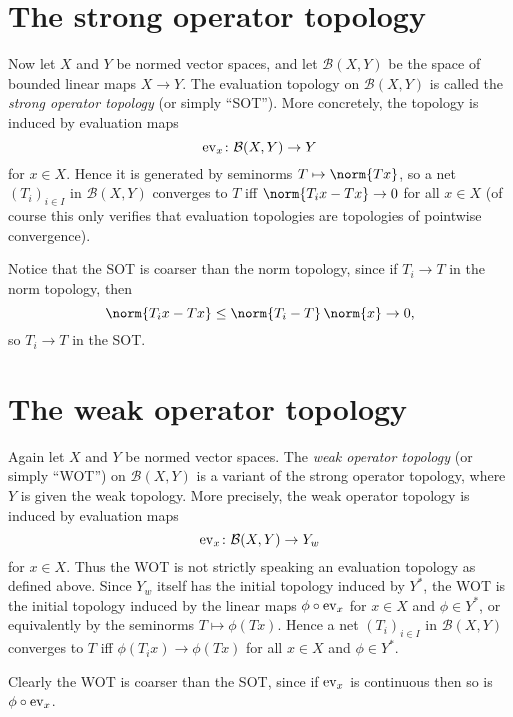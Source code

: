 \documentclass[article, a4paper, 11pt, oneside]{memoir}
\numberwithin{equation}{chapter}
\newcommand{\calB}{\mathcal{B}}
\begin{document}
\section{The strong operator topology}

Now let $X$ and $Y$ be normed vector spaces, and let $\calB(X,Y)$ be the space of bounded linear maps $X \to Y$. The evaluation topology on $\calB(X,Y)$ is called the \emph{strong operator topology} (or simply \enquote{SOT}). More concretely, the topology is induced by evaluation maps
%
\begin{equation*}
    \ev_x \colon \calB(X,Y) \to Y
\end{equation*}
%
for $x \in X$. Hence it is generated by seminorms $T \mapsto \norm{Tx}$, so a net $(T_i)_{i \in I}$ in $\calB(X,Y)$ converges to $T$ iff $\norm{T_i x - Tx} \to 0$ for all $x \in X$ (of course this only verifies that evaluation topologies are topologies of pointwise convergence).
    
Notice that the SOT is coarser than the norm topology, since if $T_i \to T$ in the norm topology, then
%
\begin{equation*}
    \norm{T_i x - Tx}
        \leq \norm{T_i - T} \, \norm{x}
        \to 0,
\end{equation*}
%
so $T_i \to T$ in the SOT.


\section{The weak operator topology}

Again let $X$ and $Y$ be normed vector spaces. The \emph{weak operator topology} (or simply \enquote{WOT}) on $\calB(X,Y)$ is a variant of the strong operator topology, where $Y$ is given the weak topology. More precisely, the weak operator topology is induced by evaluation maps
%
\begin{equation*}
    \ev_x \colon \calB(X,Y) \to Y_w
\end{equation*}
%
for $x \in X$. Thus the WOT is not strictly speaking an evaluation topology as defined above. Since $Y_w$ itself has the initial topology induced by $Y^*$, the WOT is the initial topology induced by the linear maps $\phi \circ \mathrm{ev}_x$ for $x \in X$ and $\phi \in Y^*$, or equivalently by the seminorms $T \mapsto \phi(Tx)$. Hence a net $(T_i)_{i \in I}$ in $\calB(X,Y)$ converges to $T$ iff $\phi(T_i x) \to \phi(Tx)$ for all $x \in X$ and $\phi \in Y^*$.

Clearly the WOT is coarser than the SOT, since if $\mathrm{ev}_x$ is continuous then so is $\phi \circ \mathrm{ev}_x$.
\end{document}
